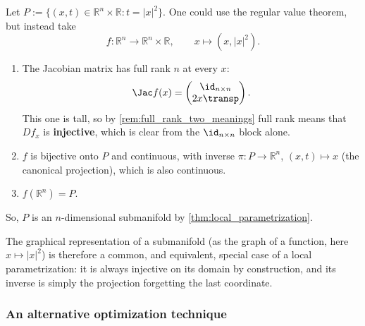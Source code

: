 \begin{example}
Let $P := \{(x,t) \in \mathbb{R}^n\times\mathbb{R} : t=|x|^2\}$. One could use the regular value
theorem, but instead take
\[f : \mathbb{R}^n \to \mathbb{R}^n\times\mathbb{R}, \qquad x \mapsto (x,|x|^2).\]
\begin{enumerate}[label=\textbf{(\alph*)}]
  \item The Jacobian matrix has full rank $n$ at every $x$:
\[ \Jac f(x) = \begin{pmatrix} \id_{n\times n} \\ 2x\transp \end{pmatrix}. \]
    This one is tall, so by \cref{rem:full_rank_two_meanings} full rank means that $Df_x$ is
    \textbf{injective}, which is clear from the $\id_{n\times n}$ block alone.
  \item $f$ is bijective onto $P$ and continuous, with inverse $\pi : P \to \mathbb{R}^n$,
    $(x,t) \mapsto x$ (the canonical projection), which is also continuous.
  \item $f(\mathbb{R}^n) = P$.
\end{enumerate}
So, $P$ is an $n$-dimensional submanifold by \cref{thm:local_parametrization}.

\begin{remark}
The graphical representation of a submanifold (as the graph of a function, here $x \mapsto |x|^2$)
is therefore a common, and equivalent, special case of a local parametrization: it is always
injective on its domain by construction, and its inverse is simply the projection forgetting the
last coordinate.
\end{remark}
\end{example}

\begin{center}
\end{center}

\subsubsection{An alternative optimization technique}

